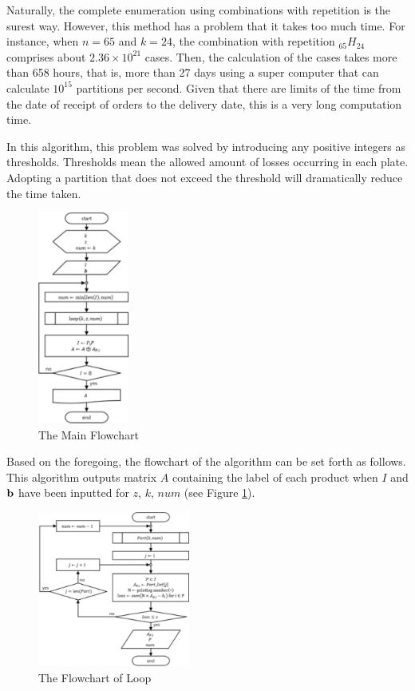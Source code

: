 Naturally, the complete enumeration using combinations with repetition is the surest way. 
However, this method has a problem that it takes too much time. 
For instance, when $n=65$ and $k = 24$, the combination with repetition $_{65}H_{24}$ comprises about $2.36 \times 10^{21}$ cases.
Then, the calculation of the cases takes more than 658 hours, that is, more than 27 days using a super computer that can calculate $10^{15}$ partitions per second. 
Given that there are limits of the time from the date of receipt of orders to the delivery date, this is a very long computation time.

In this algorithm, this problem was solved by introducing any positive integers as thresholds. 
Thresholds mean the allowed amount of losses occurring in each plate. 
Adopting a partition that does not exceed the threshold will dramatically reduce the time taken.

\begin{figure}[h!]
	\centering
	\includegraphics[width=3cm]{MainFChart.pdf}
	\caption{The Main Flowchart}
	\label{fig:MFChart}       %
\end{figure}

Based on the foregoing, the flowchart of the algorithm can be set forth as follows. 
This algorithm outputs matrix $A$ containing the label of each product when $I$ and ${\bf b}$ have been inputted for $z$, $k$, $num$ (see Figure \ref{fig:MFChart}). 

\begin{figure}[h!]
	\centering
	\includegraphics[width=5cm]{SubFChart.pdf}
	\caption{The Flowchart of Loop}
	\label{fig:SFChart}       %
\end{figure}

